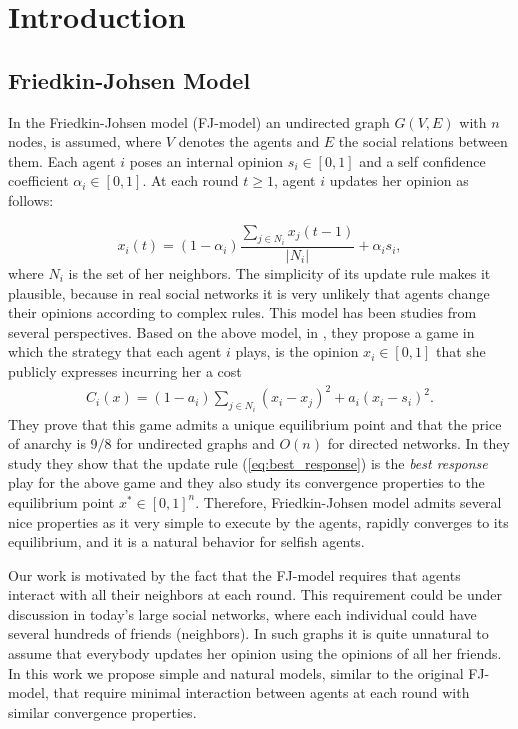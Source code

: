 \section{Introduction}

\subsection{Friedkin-Johsen Model}
In the Friedkin-Johsen model (FJ-model) an undirected graph $G(V,E)$ with $n$
nodes, is assumed, where $V$ denotes the agents and $E$ the social relations between
them. Each agent $i$ poses an internal opinion $s_i \in [0,1]$ and a self confidence coefficient
$\alpha_i \in[0,1]$. At each round $t\geq 1$, agent $i$ updates her opinion
as follows:

\begin{equation}\label{eq:best_response}
  x_i(t) = (1-\alpha_i) \frac{\sum_{j \in N_i}x_j(t-1)}{|N_i|} + \alpha_i s_i,
\end{equation}
where $N_i$ is the set of her neighbors. The simplicity of its update rule makes it plausible, because in
real social networks it is very unlikely that agents change their opinions
according to complex rules. This model has been studies from several perspectives.
Based on the above model, in \cite{BKO11}, they propose a game
in which the strategy that each agent $i$ plays, is the opinion $x_i \in [0,1]$
that she publicly expresses incurring her a cost
\begin{align}\label{eq:kleinberg_cost}
  C_i(x) = (1-a_i) \sum_{j \in N_i} (x_i - x_j)^2 + a_i (x_i - s_i)^2.
\end{align}
They prove that this game admits a unique equilibrium point and that
the price of anarchy is $9/8$ for undirected graphs and $O(n)$ for
directed networks.  In \cite{GS14} they study they show that the update
rule (\ref{eq:best_response}) is the \emph{best response} play for the above
game and they also study its convergence properties to the equilibrium point
$x^* \in [0,1]^n$. Therefore, Friedkin-Johsen model admits several nice properties
as it very simple to execute by the agents, rapidly converges to its equilibrium,
and it is a natural behavior for selfish agents.

Our work is motivated by the fact that the FJ-model requires that
agents interact with all their neighbors at each round. This requirement
could be under discussion in today's large social networks, where each individual
could have several hundreds of friends (neighbors). In such graphs it is quite
unnatural to assume that everybody updates her opinion using the opinions of all
her friends. In this work we propose simple and natural models, similar to
the original FJ-model, that require minimal interaction between agents at each
round with similar convergence properties.

